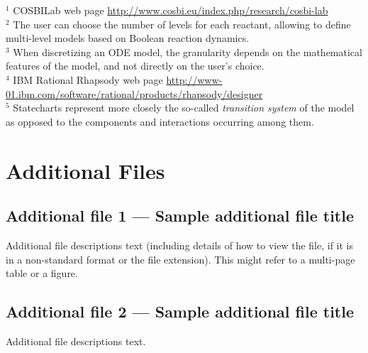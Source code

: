 \documentclass{bmcart}
\begin{document}
\begin{backmatter}
\begin{table}[!hbt]
\begin{minipage}{\textwidth}
{\scriptsize $^1$ {COSBILab} web page \url{http://www.cosbi.eu/index.php/research/cosbi-lab}\\
$^2$ The user can choose the number of levels for each reactant, allowing to define
multi-level models based on Boolean reaction dynamics.\\
$^3$ When discretizing an ODE model, the granularity depends on the mathematical
features of the model, and not directly on the user's choice.\\
$^4$ {IBM Rational Rhapsody} web page \url{http://www-01.ibm.com/software/rational/products/rhapsody/designer}\\
$^5$ Statecharts represent more closely the so-called
\emph{transition system} of the model as opposed to the components and interactions occurring among them.}
\end{minipage}
\end{table}



\section*{Additional Files}
  \subsection*{Additional file 1 --- Sample additional file title}
    Additional file descriptions text (including details of how to
    view the file, if it is in a non-standard format or the file extension).  This might
    refer to a multi-page table or a figure.

  \subsection*{Additional file 2 --- Sample additional file title}
    Additional file descriptions text.


\end{backmatter}
\end{document}
